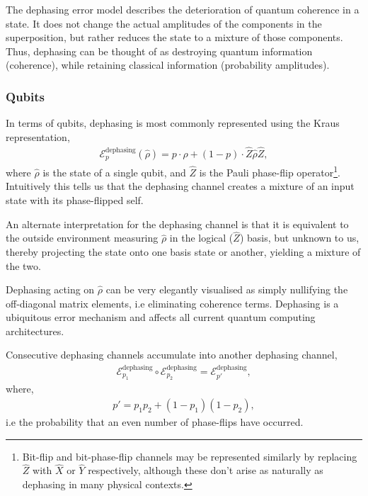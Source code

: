 The dephasing error model describes the deterioration of quantum coherence in a state. It does not change the actual amplitudes of the components in the superposition, but rather reduces the state to a mixture of those components. Thus, dephasing can be thought of as destroying quantum information (coherence), while retaining classical information (probability amplitudes). 


\subsubsection{Qubits}

In terms of qubits, dephasing is most commonly represented using the Kraus representation,
\begin{align} \label{eq:dephasing_channel}
\mathcal{E}_p^\mathrm{dephasing}(\hat\rho) = p\cdot\hat\rho + (1-p)\cdot \hat{Z}\hat\rho\hat{Z},
\end{align}
where $\hat\rho$ is the state of a single qubit, and $\hat{Z}$ is the Pauli phase-flip operator\footnote{Bit-flip and bit-phase-flip channels may be represented similarly by replacing $\hat{Z}$ with $\hat{X}$ or $\hat{Y}$ respectively, although these don't arise as naturally as dephasing in many physical contexts.}. Intuitively this tells us that the dephasing channel creates a mixture of an input state with its phase-flipped self.

An alternate interpretation for the dephasing channel is that it is equivalent to the outside environment measuring $\hat\rho$ in the logical ($\hat{Z}$) basis, but unknown to us, thereby projecting the state onto one basis state or another, yielding a mixture of the two.

Dephasing acting on $\hat\rho$ can be very elegantly visualised as simply nullifying the off-diagonal matrix elements, i.e eliminating coherence terms. Dephasing is a ubiquitous error mechanism and affects all current quantum computing architectures.

Consecutive dephasing channels accumulate into another dephasing channel,
\begin{align} \label{eq:multi_deph}
\mathcal{E}_{p_1}^\mathrm{dephasing} \circ \mathcal{E}_{p_2}^\mathrm{dephasing} = \mathcal{E}_{p'}^\mathrm{dephasing},
\end{align}
where,
\begin{align}
	p' = p_1 p_2 + (1-p_1)(1-p_2),
\end{align}
i.e the probability that an even number of phase-flips have occurred.

